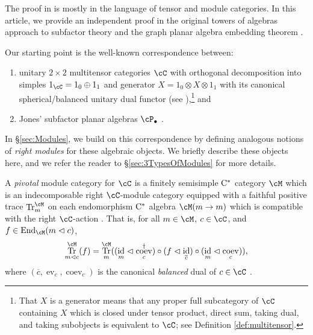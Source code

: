 \documentclass[11pt]{article}
\theoremstyle{plain}
\theoremstyle{definition}
\DeclareMathOperator{\coev}{coev}
\DeclareMathOperator{\End}{End}
\DeclareMathOperator{\ev}{ev}
\DeclareMathOperator{\id}{id}
\DeclareMathOperator{\Tr}{Tr}
\newcommand{\Cstar}{\rm{C^*}}
\begin{document}
The proof in \cite{1810.06076} is mostly in the language of tensor and module categories.
In this article, we provide an independent proof in the original towers of algebras approach to subfactor theory \cite{MR0696688,MR936086,MR999799,MR1278111} and the graph planar algebra embedding theorem \cite{MR2812459}.

Our starting point is the well-known correspondence between:
\begin{enumerate}[label={\rm(\arabic*)}]
\item
unitary $2\times 2$ multitensor categories $\cC$ with orthogonal decomposition into simples $1_\cC = 1_0 \oplus 1_1$ and generator $X = 1_0 \otimes X \otimes 1_1$ with its canonical spherical/balanced unitary dual functor
(see \cite{MR2091457,1808.00323}),\footnote{
 That $X$ is a generator means that any proper full subcategory of $\cC$ containing $X$ which is closed under tensor product, direct sum, taking dual, and taking subobjects is equivalent to $\cC$; see Definition \ref{def:multitensor}. 
} 
and
\item
Jones' subfactor planar algebras $\cP_\bullet$ \cite{math.QA/9909027}.
\end{enumerate}
In \S\ref{sec:Modules}, we build on this correspondence by defining analogous notions of \emph{right modules} for these algebraic objects.
We briefly describe these objects here, and we refer the reader to \S\ref{sec:3TypesOfModules} for more details.

A \emph{pivotal} module category for $\cC$ is a finitely semisimple $\Cstar$ category $\cM$ which is an indecomposable right $\cC$-module category equipped with a faithful positive trace $\Tr^\cM_m$ on each endomorphism $\Cstar$ algebra $\cM(m\to m)$ which is compatible with the right $\cC$-action \cite{MR3019263,1810.06076}.
That is, for all $m\in \cM$, $c\in \cC$, and $f\in \End_\cM(m \vartriangleleft c)$, 
$$
\Tr^\cM_{m\vartriangleleft c}(f)
=
\Tr^\cM_{m}(
(\id_m \vartriangleleft\coev_c^\dag) \circ (f\vartriangleleft\id_{\overline{c}}) \circ (\id_m \vartriangleleft \coev_c)
),
$$
where $(\overline{c}, \ev_c, \coev_c)$ is the canonical \emph{balanced} dual of $c\in \cC$ \cite{MR1444286,MR2091457,MR3342166,1808.00323}.
\end{document}
